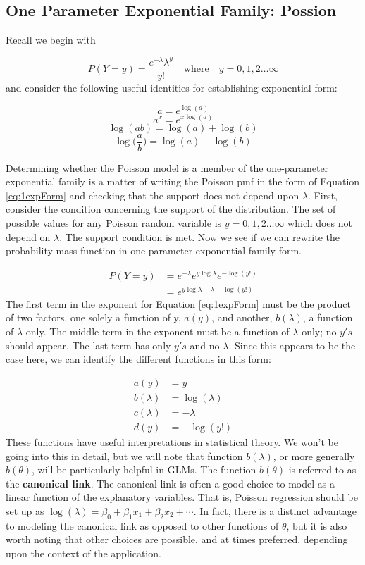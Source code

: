 \documentclass[
]{krantz}
\begin{document}
\hypertarget{one-parameter-exponential-family-possion}{%
\subsection{One Parameter Exponential Family: Possion}\label{one-parameter-exponential-family-possion}}

Recall we begin with

\[
P(Y=y)=\frac{e^{-\lambda}{\lambda}^y}{y!}\quad \textrm{where}\quad y=0,1,2\ldots\infty
\]
and consider the following useful identities for establishing exponential form:

\[a=e^{\log(a)} \]
\[a^x = e^{x\log(a)}\]
\[\log(ab)=\log(a)+\log(b)\]
\[\log\Big(\frac{a}{b}\Big)=\log(a)-\log(b)\]

Determining whether the Poisson model is a member of the one-parameter exponential family is a matter of writing the Poisson pmf in the form of Equation \eqref{eq:1expForm} and checking that the support does not depend upon \(\lambda\). First, consider the condition concerning the support of the distribution. The set of possible values for any Poisson random variable is \(y=0,1,2\ldots\infty\) which does not depend on \(\lambda\). The support condition is met. Now we see if we can rewrite the probability mass function in one-parameter exponential family form.

\begin{align*}
 P(Y=y)&= {e^{-\lambda}e^{y\log \lambda}e^{-\log (y!)}} \nonumber \\
       &= e^{y\log \lambda-\lambda-\log (y!)}
 \end{align*}
The first term in the exponent for Equation \eqref{eq:1expForm} must be the product of two factors, one solely a function of y, \(a(y)\), and another, \(b(\lambda)\), a function of \(\lambda\) only. The middle term in the exponent must be a function of \(\lambda\) only; no \(y's\) should appear. The last term has only \(y's\) and no \(\lambda\). Since this appears to be the case here, we can identify the different functions in this form:

\begin{align*}
a(y)&=y \\
b(\lambda)&=\log(\lambda) \\
c(\lambda)&=-\lambda \\
d(y)&=-\log (y!)
\label{eq:diffunc}
\end{align*}
These functions have useful interpretations in statistical theory. We won't be going into this in detail, but we will note that function \(b(\lambda)\), or more generally \(b(\theta)\), will be particularly helpful in GLMs. The function \(b(\theta)\) is referred to as the \textbf{canonical link}.  The canonical link is often a good choice to model as a linear function of the explanatory variables. That is, Poisson regression should be set up as \(\log(\lambda)=\beta_0+\beta_1x_1+\beta_2x_2+\cdots\). In fact, there is a distinct advantage to modeling the canonical link as opposed to other functions of \(\theta\), but it is also worth noting that other choices are possible, and at times preferred, depending upon the context of the application.
\end{document}
